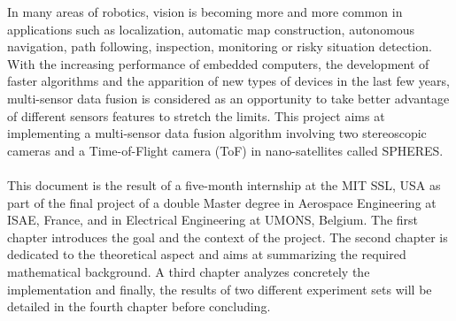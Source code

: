 \cleardoublepage
\setcounter{savepage}{\thepage}
\begin{abstractpage}
In many areas of robotics, vision is becoming more and more common in applications such as localization, automatic map construction, autonomous navigation, path following, inspection, monitoring or risky situation detection. With the increasing performance of embedded computers, the development of faster algorithms and the apparition of new types of devices in the last few years, multi-sensor data fusion is considered as an opportunity to take better advantage of different sensors features to stretch the limits. This project aims at implementing a multi-sensor data fusion algorithm involving two stereoscopic cameras and a Time-of-Flight camera (\gls{ToF}) in nano-satellites called SPHERES.\\\\
This document is the result of a five-month internship at the MIT SSL, USA as part of the final project of a double Master degree in Aerospace Engineering at ISAE, France, and in Electrical Engineering at UMONS, Belgium. The first chapter introduces the goal and the context of the project. The second chapter is dedicated to the theoretical aspect and aims at summarizing the required mathematical background. A third chapter analyzes concretely the implementation and finally, the results of two different experiment sets will be detailed in the fourth chapter before concluding.
\end{abstractpage}

% 

\cleardoublepage

